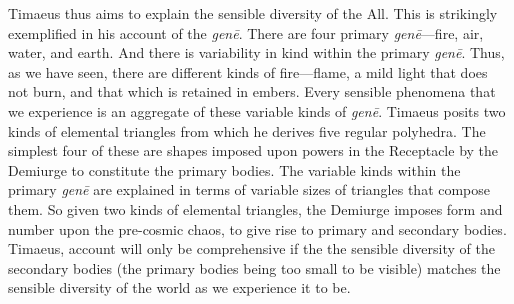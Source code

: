 Timaeus thus aims to explain the sensible diversity of the All. This is strikingly exemplified in his account of the \emph{genē}. There are four primary \emph{genē}---fire, air, water, and earth. And there is variability in kind within the primary \emph{genē}. Thus, as we have seen, there are different kinds of fire---flame, a mild light that does not burn, and that which is retained in embers. Every sensible phenomena that we experience is an aggregate of these variable kinds of \emph{genē}. Timaeus posits two kinds of elemental triangles from which he derives five regular polyhedra. The simplest four of these are shapes imposed upon powers in the Receptacle by the Demiurge to constitute the primary bodies. The variable kinds within the primary \emph{genē} are explained in terms of variable sizes of triangles that compose them. So given two kinds of elemental triangles, the Demiurge imposes form and number upon the pre-cosmic chaos, to give rise to primary and secondary bodies. Timaeus, account will only be comprehensive if the the sensible diversity of the secondary bodies (the primary bodies being too small to be visible) matches the sensible diversity of the world as we experience it to be.

